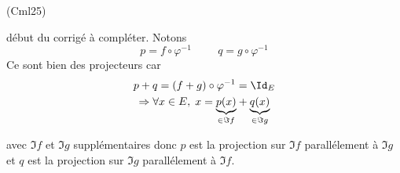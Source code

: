 \begin{tiny}(Cml25)\end{tiny} début du corrigé à compléter. Notons
\begin{displaymath}
  p = f\circ \varphi^{-1} \hspace{1cm} q = g\circ \varphi^{-1}
\end{displaymath}
Ce sont bien des projecteurs car
\begin{multline*}
  p + q = (f+g)\circ \varphi^{-1} = \Id_E\\
\Rightarrow \forall x\in E,\;
x = \underset{\in \Im f}{\underbrace{p(x)}} + \underset{\in \Im g}{\underbrace{q(x)}}
\end{multline*}

avec $\Im f$ et $\Im g$ supplémentaires donc $p$ est la projection sur $\Im f$ parallélement à $\Im g$ et $q$ est la projection sur $\Im g$ parallélement à $\Im f$.

